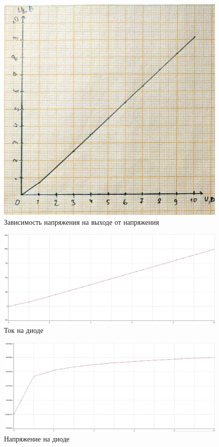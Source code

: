 \documentclass{labreport}
\begin{document}
\begin{figure}[h]
    \centering
    \includegraphics[width=\linewidth]{graph_h_u_o.png}
    \caption{Зависимость напряжения на выходе от напряжения}
\end{figure}


\begin{figure}[h]
    \centering
    \includegraphics[width=\linewidth]{graph_m_i_d.jpg}
    \caption{Ток на диоде}
\end{figure}

\begin{figure}[h]
    \centering
    \includegraphics[width=\linewidth]{graph_m_u_d.jpg}
    \caption{Напряжение на диоде}
\end{figure}
\end{document}
